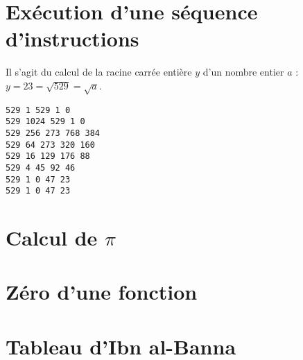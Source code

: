 \documentclass[11pt,a4paper]{article}
\begin{document}
\entete

\section{Exécution d'une séquence d'instructions}
%

\noindent\begin{minipage}{8cm}
Il s'agit du calcul de la racine carrée entière $y$ d'un nombre entier $a$ :
$y = 23 = \sqrt{529} = \sqrt{a}$.
\end{minipage}
\hfill
\begin{py}{7cm}
\begin{verbatim}
529 1 529 1 0
529 1024 529 1 0
529 256 273 768 384
529 64 273 320 160
529 16 129 176 88
529 4 45 92 46
529 1 0 47 23
529 1 0 47 23
\end{verbatim}
\end{py}

\section{Calcul de $\pi$}



\section{Zéro d'une fonction}


\section{Tableau d'Ibn al-Banna}

\label{fini}
\end{document}
